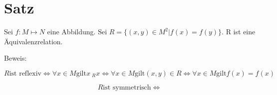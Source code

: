 \documentclass[a4paper,10pt]{article}
\begin{document}
\section{Satz}

Sei $f: M \mapsto N$ eine Abbildung.
Sei $R = \{ (x, y) \in M^2 | f(x) = f(y) \}$.
R ist eine Äquivalenzrelation.

Beweis:

\begin{equation}
 R \text{ist reflexiv} \Leftrightarrow \forall x \in M \text{gilt} x ~_R x \Leftrightarrow \forall x \in M \text{gilt} (x, y) \in R
 \Leftrightarrow \forall x \in M \text{gilt} f(x) = f(x)
\end{equation}

\begin{equation}
 R \text{ist symmetrisch} \Leftrightarrow
\end{equation}
\end{document}
